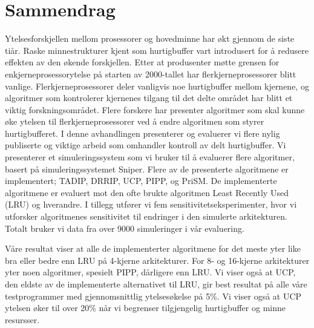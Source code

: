 \section*{Sammendrag}
Ytelsesforskjellen mellom prosessorer og hovedminne har økt gjennom de siste tiår.
Raske minnestrukturer kjent som hurtigbuffer vart introdusert for å redusere effekten av den økende forskjellen.
Etter at produsenter møtte grensen for enkjerneprosessorytelse på starten av 2000-tallet har flerkjerneprosessorer blitt vanlige.
Flerkjerneprosessorer deler vanligvis noe hurtigbuffer mellom kjernene, og algoritmer som kontrolerer kjernenes tilgang til det delte området har blitt et viktig forskningsområdet.
Flere forskere har presenter algoritmer som skal kunne øke ytelsen til flerkjerneprosessorer ved å endre algoritmen som styrer hurtigbufferet.
I denne avhandlingen presenterer og evaluerer vi flere nylig publiserte og viktige arbeid som omhandler kontroll av delt hurtigbuffer.
Vi presenterer et simuleringssystem som vi bruker til å evaluerer flere algoritmer, basert på simuleringssystemet Sniper.
Flere av de presenterte algoritmene er implementert; TADIP, DRRIP, UCP, PIPP, og PriSM.
De implementerte algoritmene er evaluert mot den ofte brukte algoritmen Least Recently Used (LRU) og hverandre.
I tillegg utfører vi fem sensitivitetseksperimenter, hvor vi utforsker algoritmenes sensitivitet til endringer i den simulerte arkitekturen.
Totalt bruker vi data fra over 9000 simuleringer i vår evaluering.

Våre resultat viser at alle de implementerter algoritmene for det meste yter like bra eller bedre enn LRU på 4-kjerne arkitekturer.
For 8- og 16-kjerne arkitekturer yter noen algoritmer, spesielt PIPP, dårligere enn LRU.
Vi viser også at UCP, den eldste av de implementerte alternativet til LRU, gir best resultat på alle våre testprogrammer med gjennomsnittlig ytelsesøkelse på 5\%.
Vi viser også at UCP ytelsen øker til over 20\% når vi begrenser tilgjengelig hurtigbuffer og minne resursser.

\clearpage